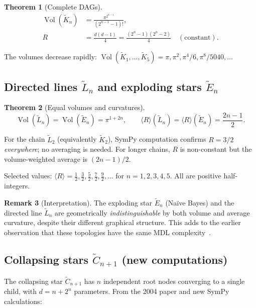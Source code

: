 \documentclass[11pt]{article}
\newtheorem{theorem}{Theorem}[section]
\theoremstyle{definition}
\newtheorem{remark}[theorem]{Remark}
\DeclareMathOperator{\Vol}{Vol}
\begin{document}
\begin{theorem}[Complete DAGs]\label{thm:Kn}
\begin{align}
  \Vol(\tilde{K}_n) &= \frac{\pi^{2^{n-1}}}{(2^{n-1}-1)!}, \label{eq:Kn_vol}\\
  R &= \frac{d(d-1)}{4} = \frac{(2^n-1)(2^n-2)}{4} \quad (\text{constant}). \label{eq:Kn_R}
\end{align}
\end{theorem}

\noindent The volumes decrease rapidly:
$\Vol(\tilde{K}_1,\ldots,\tilde{K}_5) = \pi,\pi^2,\pi^4/6,\pi^8/5040,\ldots$

\subsection{Directed lines $\tilde{L}_n$ and exploding stars $\tilde{E}_n$}\label{sec:LnEn}

\begin{theorem}[Equal volumes and curvatures]\label{thm:LnEn}
\[
  \Vol(\tilde{L}_n) = \Vol(\tilde{E}_n) = \pi^{1+2n},
  \qquad
  \langle R\rangle(\tilde{L}_n) = \langle R\rangle(\tilde{E}_n) = \frac{2n-1}{2}.
\]
\end{theorem}

\noindent For the chain $\tilde{L}_2$ (equivalently $\tilde{K}_2$), 
SymPy computation confirms $R = 3/2$ \emph{everywhere}; no averaging is needed.  
For longer chains, $R$ is non-constant but the volume-weighted average is $(2n-1)/2$.

Selected values: $\langle R\rangle = \tfrac{1}{2}, \tfrac{3}{2}, \tfrac{5}{2}, 
\tfrac{7}{2}, \tfrac{9}{2}, \ldots$ for $n=1,2,3,4,5$.  
All are positive half-integers.

\begin{remark}[Interpretation]
The exploding star $\tilde{E}_n$ (Na\"ive Bayes) and the directed line $\tilde{L}_n$ 
are geometrically \emph{indistinguishable} by both volume and average curvature, 
despite their different graphical structure.  This adds to the earlier observation 
that these topologies have the same MDL complexity~\cite{Rod04}.
\end{remark}

\subsection{Collapsing stars $\tilde{C}_{n+1}$ (new computations)}\label{sec:Cn}

The collapsing star $\tilde{C}_{n+1}$ has $n$ independent root nodes 
converging to a single child, with $d = n + 2^n$ parameters.  
From the 2004 paper and new SymPy calculations:
\end{document}
